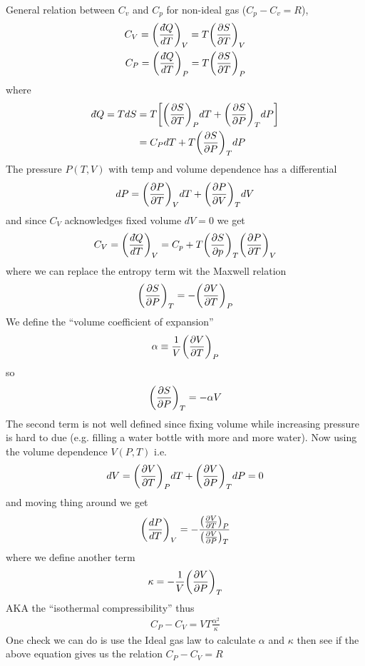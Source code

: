 \documentclass[../main.tex]{subfiles}
\begin{document}
General relation between $C_v$ and $C_p$ for non-ideal gas ($C_p - C_v = R$), 
\begin{align*}
    C_V = \qt(\frac{\dbar Q}{dT})_V = T \qt(\pdv{S}{T})_V \\
    C_P = \qt(\frac{\dbar Q}{dT})_P = T \qt(\pdv{S}{T})_P
\end{align*}
where
\begin{align*}
    \dbar Q = T dS &= T \qt[
        \qt(\pdv{S}{T})_P dT + \qt(\pdv{S}{P})_T dP
    ] \\
    &= C_P dT + T \qt(\pdv{S}{P})_T dP
\end{align*}
The pressure $P(T,V)$ with temp and volume dependence has a differential
\begin{align*}
    dP = \qt(\pdv{P}{T})_V dT + \qt(\pdv{P}{V})_T dV
\end{align*}
and since $C_V$ acknowledges fixed volume $dV = 0$ we get
\begin{align*}
    C_V = \qt(\frac{\dbar Q}{dT})_V = C_p + T \qt(\pdv{S}{p})_T \qt(\pdv{P}{T})_V 
\end{align*}
where we can replace the entropy term wit the Maxwell relation
\begin{align*}
    \qt(\pdv{S}{P})_T = -\qt(\pdv{V}{T})_P
\end{align*}
We define the ``volume coefficient of expansion''
\begin{align*}
    \alpha \equiv \frac{1}{V} \qt(\pdv{V}{T})_P
\end{align*}
so
\begin{align*}
    \qt(\pdv{S}{P})_T = - \alpha V
\end{align*}
The second term is not well defined since fixing volume while increasing pressure is hard to due (e.g. filling a water bottle with more and more water). 
Now using the volume dependence $V(P,T)$ i.e.
\begin{align*}
    dV = \qt(\pdv{V}{T})_P dT + \qt(\pdv{V}{P})_T dP = 0
\end{align*}
and moving thing around we get
\begin{align*}
    \qt(\frac{dP}{dT})_V = - \frac{\qt(\pdv{V}{T})_P}{\qt(\pdv{V}{P})_T}
\end{align*}
where we define another term
\begin{align*}
    \kappa = -\frac{1}{V} \qt(\pdv{V}{P})_T
\end{align*}
AKA the ``isothermal compressibility'' thus
\begin{align*}
    \boxed{C_P - C_V = VT \frac{\alpha^2}{\kappa}} 
\end{align*}
One check we can do is use the Ideal gas law to calculate $\alpha$ and $\kappa$ then see if the above equation gives us the relation $C_P - C_V = R$
\end{document}
